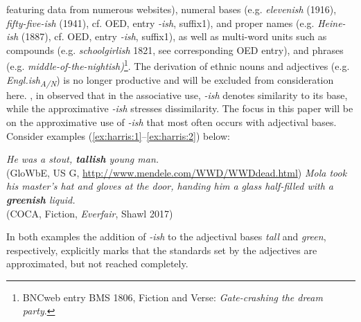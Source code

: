 \documentclass[output=paper]{langsci/langscibook}
\begin{document}
featuring data from numerous websites), numeral bases (e.g.  \textit{elevenish} (1916),  \textit{fifty-five-ish} (1941), cf. OED, entry \textit{-ish}, suffix1), and proper names (e.g.  \textit{Heine-ish} (1887), cf. OED, entry \textit{-ish}, suffix1), as well as multi-word units such as compounds (e.g.  \textit{schoolgirlish} 1821, see corresponding OED entry), and phrases (e.g.  \textit{middle-of-the-nightish)}\footnote{BNCweb entry \cite{BNCweb} BMS 1806, Fiction and Verse: \textit{Gate-crashing the dream party}.}. The derivation of ethnic nouns and adjectives (e.g.  \textit{Engl.ish\textsubscript{A/N}}) is no longer productive and will be excluded from consideration here. \textcite{Kuzmack2007}, in \textcite*[234]{Traugott2013} observed that in the associative use,  \textit{-ish} denotes similarity to its base, while the approximative  \textit{-ish} stresses dissimilarity. The focus in this paper will be on the approximative use of  \textit{-ish} that most often occurs with adjectival bases. Consider examples (\ref{ex:harris:1}--\ref{ex:harris:2}) below:

\ea\label{ex:harris:1}
	\textit{He was a stout, \textbf{tallish} young man.} \\ (GloWbE, US G, \url{http://www.mendele.com/WWD/WWDdead.html})
\ex\label{ex:harris:2} 
	\textit{Mola took his master's hat and gloves at the door, handing him a glass half-filled with a \textbf{greenish} liquid.}\\ (COCA, Fiction, \textit{Everfair}, Shawl 2017)
\z

In both examples the addition of \textit{-ish} to the adjectival bases  \textit{tall} and  \textit{green}, respectively, explicitly marks that the standards set by the adjectives are approximated, but not reached completely.
\end{document}
